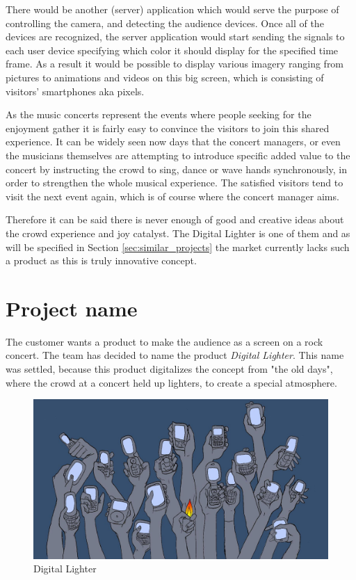 There would be another (server) application which would serve the purpose of controlling the camera, and detecting the audience devices. Once all of the devices are recognized, the server application would start sending the signals to each user device specifying which color it should display for the specified time frame. As a result it would be possible to display various imagery ranging from pictures to animations and videos on this big screen, which is consisting of visitors' smartphones aka pixels.

As the music concerts represent the events where people seeking for the enjoyment gather it is fairly easy to convince the visitors to join this shared experience. It can be widely seen now days that the concert managers, or even the musicians themselves are attempting to introduce specific added value to the concert by instructing the crowd to sing, dance or wave hands synchronously, in order to strengthen the whole musical experience. The satisfied visitors tend to visit the next event again, which is of course where the concert manager aims.

Therefore it can be said there is never enough of good and creative ideas about the crowd experience and joy catalyst. The Digital Lighter is one of them and as will be specified in Section \ref{sec:similar_projects} the market currently lacks such a product as this is truly innovative concept.

\section{Project name}
The customer wants a product to make the audience as a screen on a rock concert. 
The team has decided to name the product \emph{Digital Lighter}. 
This name was settled, because this product digitalizes the concept from "the old days", where the crowd at a concert held up lighters, to create a special atmosphere. 

\begin{figure}[hbt]
\centering
\includegraphics[width=\textwidth]{introduction/phones.jpg}
\caption{Digital Lighter}
\label{fig:digital lighter}
\end{figure}


